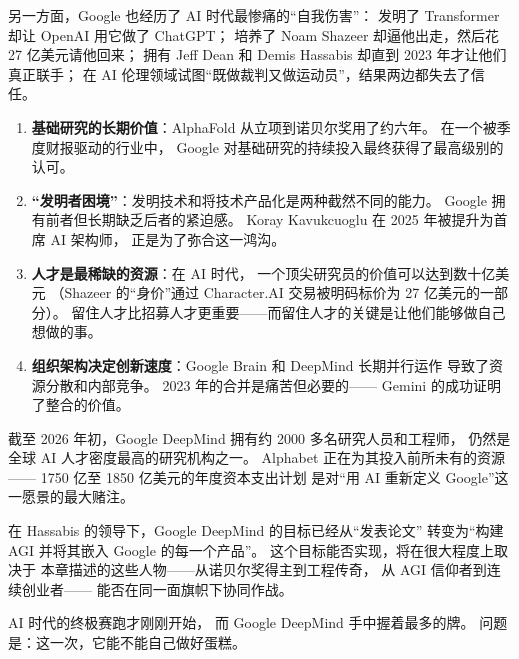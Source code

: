 另一方面，Google 也经历了 AI 时代最惨痛的``自我伤害''：
发明了 Transformer 却让 OpenAI 用它做了 ChatGPT；
培养了 Noam Shazeer 却逼他出走，然后花 27 亿美元请他回来；
拥有 Jeff Dean 和 Demis Hassabis 却直到 2023 年才让他们真正联手；
在 AI 伦理领域试图``既做裁判又做运动员''，结果两边都失去了信任。

\begin{keybox}
\begin{enumerate}[noitemsep]
  \item \textbf{基础研究的长期价值}：AlphaFold 从立项到诺贝尔奖用了约六年。
        在一个被季度财报驱动的行业中，
        Google 对基础研究的持续投入最终获得了最高级别的认可。
  \item \textbf{``发明者困境''}：发明技术和将技术产品化是两种截然不同的能力。
        Google 拥有前者但长期缺乏后者的紧迫感。
        Koray Kavukcuoglu 在 2025 年被提升为首席 AI 架构师，
        正是为了弥合这一鸿沟。
  \item \textbf{人才是最稀缺的资源}：在 AI 时代，
        一个顶尖研究员的价值可以达到数十亿美元
        （Shazeer 的``身价''通过 Character.AI 交易被明码标价为 27 亿美元的一部分）。
        留住人才比招募人才更重要——而留住人才的关键是让他们能够做自己想做的事。
  \item \textbf{组织架构决定创新速度}：Google Brain 和 DeepMind 长期并行运作
        导致了资源分散和内部竞争。
        2023 年的合并是痛苦但必要的——
        Gemini 的成功证明了整合的价值。
\end{enumerate}
\end{keybox}

截至 2026 年初，Google DeepMind 拥有约 2000 多名研究人员和工程师，
仍然是全球 AI 人才密度最高的研究机构之一。
Alphabet 正在为其投入前所未有的资源——
1750 亿至 1850 亿美元的年度资本支出计划
是对``用 AI 重新定义 Google''这一愿景的最大赌注。

在 Hassabis 的领导下，Google DeepMind 的目标已经从``发表论文''
转变为``构建 AGI 并将其嵌入 Google 的每一个产品''。
这个目标能否实现，将在很大程度上取决于
本章描述的这些人物——从诺贝尔奖得主到工程传奇，
从 AGI 信仰者到连续创业者——
能否在同一面旗帜下协同作战。

AI 时代的终极赛跑才刚刚开始，
而 Google DeepMind 手中握着最多的牌。
问题是：这一次，它能不能自己做好蛋糕。
